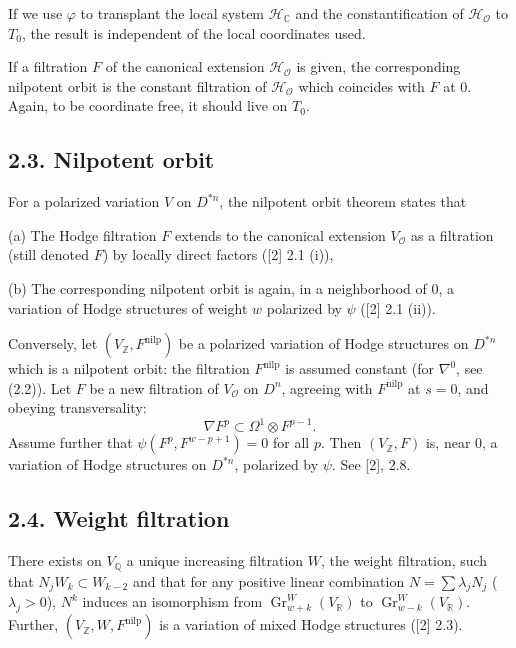 \documentclass[11pt,a4paper]{article}
\theoremstyle{plain}
\theoremstyle{definition}
\DeclareMathOperator{\Gr}{Gr}
\begin{document}
If we use $\varphi$ to transplant the local system $\mathcal{H}_{\mathbb{C}}$ and the constantification of $\mathcal{H}_{\mathcal{O}}$ to $T_{0}$, the result is independent of the local coordinates used.

If a filtration $F$ of the canonical extension $\mathcal{H}_{\mathcal{O}}$ is given, the corresponding nilpotent orbit is the constant filtration of $\mathcal{H}_{\mathcal{O}}$ which coincides with $F$ at 0. Again, to be coordinate free, it should live on $T_{0}$.

\subsection{2.3. Nilpotent orbit}

For a polarized variation $V$ on $D^{*n}$, the nilpotent orbit theorem states that

(a) The Hodge filtration $F$ extends to the canonical extension $V_{\mathcal{O}}$ as a filtration (still denoted $F$) by locally direct factors ([2] 2.1 (i)),

(b) The corresponding nilpotent orbit is again, in a neighborhood of 0, a variation of Hodge structures of weight $w$ polarized by $\psi$ ([2] 2.1 (ii)).

Conversely, let $(V_{\mathbb{Z}}, F^{\text{nilp}})$ be a polarized variation of Hodge structures on $D^{*n}$ which is a nilpotent orbit: the filtration $F^{\text{nilp}}$ is assumed constant (for $\nabla^{0}$, see (2.2)). Let $F$ be a new filtration of $V_{\mathcal{O}}$ on $D^{n}$, agreeing with $F^{\text{nilp}}$ at $s=0$, and obeying transversality:
\[
\nabla F^{p} \subset \Omega^{1} \otimes F^{p-1}.
\]
Assume further that $\psi(F^{p}, F^{w-p+1}) = 0$ for all $p$. Then $(V_{\mathbb{Z}}, F)$ is, near 0, a variation of Hodge structures on $D^{*n}$, polarized by $\psi$. See [2], 2.8.

\subsection{2.4. Weight filtration}

There exists on $V_{\mathbb{Q}}$ a unique increasing filtration $W$, the weight filtration, such that $N_{j}W_{k} \subset W_{k-2}$ and that for any positive linear combination $N = \sum \lambda_{j}N_{j}$ ($\lambda_{j} > 0$), $N^{k}$ induces an isomorphism from $\Gr_{w+k}^{W}(V_{\mathbb{R}})$ to $\Gr_{w-k}^{W}(V_{\mathbb{R}})$. Further, $(V_{\mathbb{Z}}, W, F^{\text{nilp}})$ is a variation of mixed Hodge structures ([2] 2.3).
\end{document}

